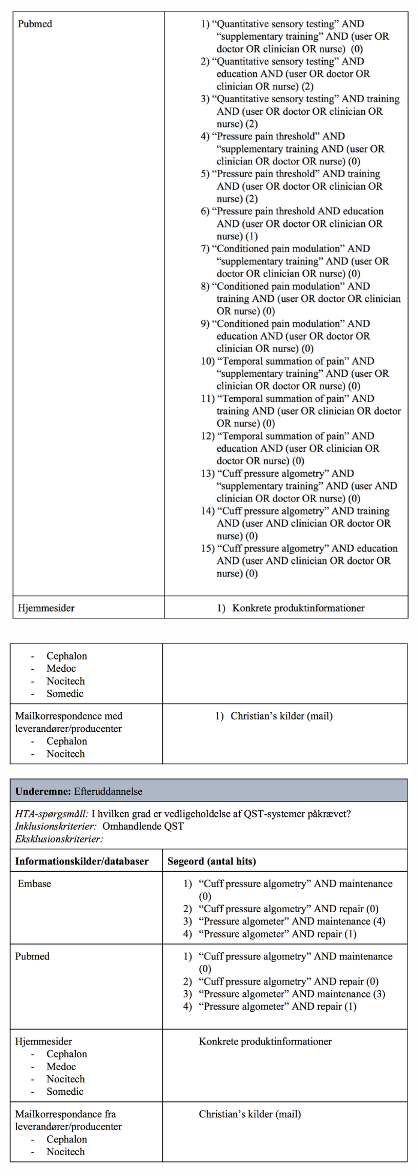 \includegraphics[width=0.8\textwidth]{rapportAfsnit/qBilag/sogninger/ORG3}

\includegraphics[width=0.8\textwidth]{rapportAfsnit/qBilag/sogninger/ORG4}

